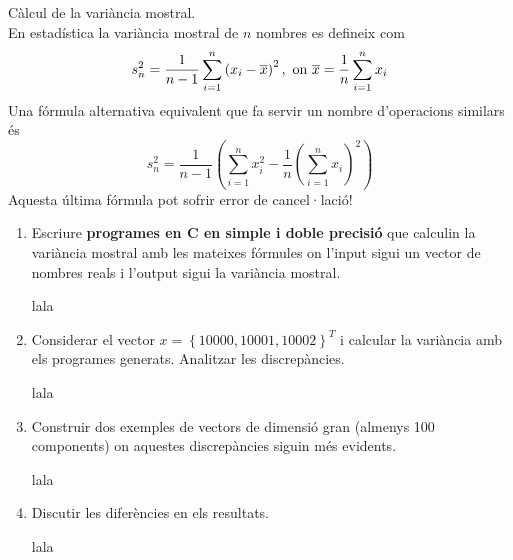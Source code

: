 \documentclass[a4paper, 12pt]{article}
\begin{document}
    \begin{exercici}
        Càlcul de la variància mostral.\\
        En estadística la variància mostral de $n$ nombres es defineix com
        \begin{equation}
            s^2_n = \frac{1}{n-1}\sum\limits_{i=1}^n\left(x_i-\overline{x}\right)^2,\hbox{ on } \overline{x} = \frac{1}{n}\sum\limits_{i=1}^n x_i
            \label{eq:4}
        \end{equation}
        Una fórmula alternativa equivalent que fa servir un nombre d'operacions similars és
        \begin{equation}
            s^2_n = \frac{1}{n-1}\left(\sum\limits_{i=1}^{n} x^2_i - \frac{1}{n}\left(\sum\limits_{i=1}^{n}x_i\right)^2\right)
            \label{eq:5}
        \end{equation}
        Aquesta última fórmula pot sofrir error de cancel·lació!
        \begin{enumerate}[label=\alph*)]
            \item Escriure \textbf{programes en C en simple i doble precisió} que calculin la
            variància mostral amb les mateixes fórmules on l'input sigui un vector de nombres reals
            i l'output sigui la variància mostral.\\
            \begin{solucio}
                lala
            \end{solucio}
            \item Considerar el vector $x = \left\{10000, 10001, 10002\right\}^T$ i calcular la
            variància amb els programes generats. Analitzar les discrepàncies.\\
            \begin{solucio}
                lala
            \end{solucio}
            \item Construir dos exemples de vectors de dimensió gran (almenys 100 components) on
            aquestes discrepàncies siguin més evidents.\\
            \begin{solucio}
                lala
            \end{solucio}
            \item Discutir les diferències en els resultats.\\
            \begin{solucio}
                lala
            \end{solucio}
        \end{enumerate}
    \end{exercici}
\end{document}

